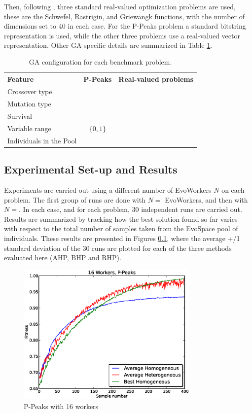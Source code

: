 \documentclass{sig-alternate}
\begin{document}
Then, following \cite{fuku1}, three standard real-valued optimization problems are used,
these are the Schwefel, Rastrigin, and Griewangk functions, with the number of dimensions set to
40 in each case. 
For the P-Peaks problem a standard bitstring representation is used, while the other three problems use a real-valued
vector representation.
Other GA specific details are summarized in Table \ref{tab:ga}.

\begin{table}[!t]
\caption{GA configuration for each benchmark problem.}
\label{tab:ga}
\centering
\begin{tabular}{|l|c|c|}
\hline
\textbf{Feature} & \textbf{P-Peaks} & \textbf{Real-valued problems} \\
\hline
\hline
Crossover type & & \\
Mutation type & & \\
Survival & & \\
Variable range & $\{0,1\}$ & \\
Individuals in the Pool &  & \\
\hline
\end{tabular}
\end{table}

\subsection{Experimental Set-up and Results}
Experiments are carried out using a different number of EvoWorkers $N$ on each problem.
The first group of runs are done with $N=$ EvoWorkers, and then with $N=$.
In each case, and for each problem, 30 independent runs are carried out.
Results are summarized by tracking how the best solution found so far varies with respect to the total
number of samples taken from the EvoSpace pool of individuals.
These results are presented in Figures \ref{}, where the average +/1 standard deviation of the 30 runs are plotted
for each of the three methods evaluated here (AHP, BHP and RHP).

\begin{figure}[t]
\centering
\includegraphics[width=3.5in]{eps/PPeaks-w16.eps}
\caption{ P-Peaks with 16 workers}
\label{fig:PPeaks-w16}
\end{figure}
\end{document}
